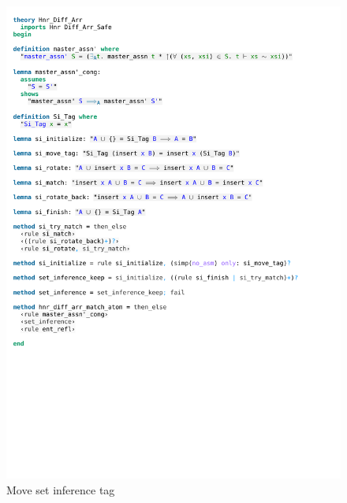 \begin{figure}[!htpb]
    \includegraphics[trim={0 20,2cm 0 9cm}, clip, width=1.00\textwidth]{figures/Theory_Hnr_Diff_Arr_SI.pdf}
    \caption[Move set inference tag]{Move set inference tag}
    \label{fig:si_move_tag}
\end{figure}

